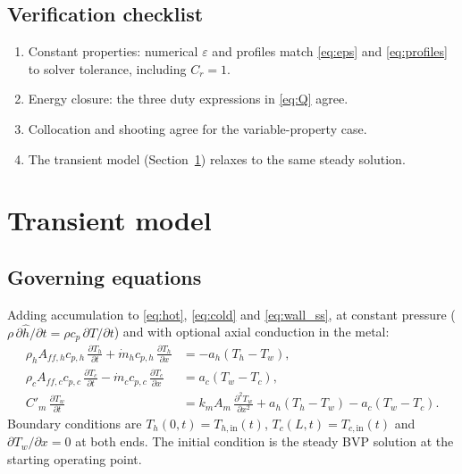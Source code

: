 \documentclass[11pt]{article}
\newcommand{\hin}{_{h,\mathrm{in}}}
\newcommand{\cin}{_{c,\mathrm{in}}}
\begin{document}
\subsection{Verification checklist}

\begin{enumerate}
  \item Constant properties: numerical $\varepsilon$ and profiles match \eqref{eq:eps} and \eqref{eq:profiles} to solver tolerance, including $C_r = 1$.
  \item Energy closure: the three duty expressions in \eqref{eq:Q} agree.
  \item Collocation and shooting agree for the variable-property case.
  \item The transient model (Section~\ref{sec:transient}) relaxes to the same steady solution.
\end{enumerate}

\section{Transient model}
\label{sec:transient}

\subsection{Governing equations}

Adding accumulation to \eqref{eq:hot}, \eqref{eq:cold} and \eqref{eq:wall_ss}, at constant pressure ($\rho\,\partial\hat h/\partial t = \rho c_p\,\partial T/\partial t$) and with optional axial conduction in the metal:
\begin{align}
  \rho_h A_{ff,h} c_{p,h}\,\frac{\partial T_h}{\partial t} + \dot m_h c_{p,h}\,\frac{\partial T_h}{\partial x}
     &= -a_h (T_h - T_w), \label{eq:pde_h}\\
  \rho_c A_{ff,c} c_{p,c}\,\frac{\partial T_c}{\partial t} - \dot m_c c_{p,c}\,\frac{\partial T_c}{\partial x}
     &= a_c (T_w - T_c), \label{eq:pde_c}\\
  C'_m\,\frac{\partial T_w}{\partial t}
     &= k_m A_m\,\frac{\partial^2 T_w}{\partial x^2} + a_h (T_h - T_w) - a_c (T_w - T_c). \label{eq:pde_w}
\end{align}
Boundary conditions are $T_h(0,t) = T\hin(t)$, $T_c(L,t) = T\cin(t)$ and $\partial T_w/\partial x = 0$ at both ends. The initial condition is the steady BVP solution at the starting operating point.
\end{document}
